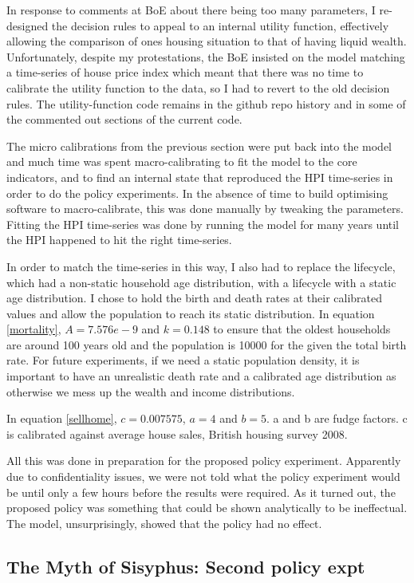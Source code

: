 \documentclass{report}
\begin{document}
In response to comments at BoE about there being too many parameters, I re-designed the decision rules to appeal to an internal utility function, effectively allowing the comparison of ones housing situation to that of having liquid wealth. Unfortunately, despite my protestations, the BoE insisted on the model matching a time-series of house price index which meant that there was no time to calibrate the utility function to the data, so I had to revert to the old decision rules. The utility-function code remains in the github repo history and in some of the commented out sections of the current code.

The micro calibrations from the previous section were put back into the model and much time was spent macro-calibrating to fit the model to the core indicators, and to find an internal state that reproduced the HPI time-series in order to do the policy experiments. In the absence of time to build optimising software to macro-calibrate, this was done manually by tweaking the parameters. Fitting the HPI time-series was done by running the model for many years until the HPI happened to hit the right time-series.

In order to match the time-series in this way, I also had to replace the lifecycle, which had a non-static household age distribution, with a lifecycle with a static age distribution. I chose to hold the birth and death rates at their calibrated values and allow the population to reach its static distribution. In equation \ref{mortality}, $A=7.576e-9$ and $k=0.148$ to ensure that the oldest households are around 100 years old and the population is 10000 for the given the total birth rate. For future experiments, if we need a static population density, it is important to have an unrealistic death rate and a calibrated age distribution as otherwise we mess up the wealth and income distributions.

In equation \ref{sellhome}, $c=0.007575$, $a=4$ and $b=5$. a and b are fudge factors. c is calibrated against average house sales, British housing survey 2008.

All this was done in preparation for the proposed policy experiment. Apparently due to confidentiality issues, we were not told what the policy experiment would be until only a few hours before the results were required. As it turned out, the proposed policy was something that could be shown analytically to be ineffectual. The model, unsurprisingly, showed that the policy had no effect.

\subsection{The Myth of Sisyphus: Second policy expt}
\end{document}
